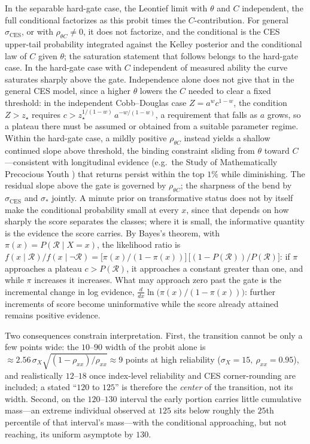 \documentclass{article}
\begin{document}
In the separable hard-gate case, the Leontief limit with $\theta$ and $C$ independent, the full conditional factorizes as this probit times the $C$-contribution. For general $\sigma_{\mathrm{CES}}$, or with $\rho_{\theta C} \neq 0$, it does not factorize, and the conditional is the CES upper-tail probability integrated against the Kelley posterior and the conditional law of $C$ given $\theta$; the saturation statement that follows belongs to the hard-gate case. In the hard-gate case with $C$ independent of measured ability the curve saturates sharply above the gate. Independence alone does not give that in the general CES model, since a higher $\theta$ lowers the $C$ needed to clear a fixed threshold: in the independent Cobb--Douglas case $Z = a^{w} c^{1-w}$, the condition $Z > z_{\star}$ requires $c > z_{\star}^{1/(1-w)}\,a^{-w/(1-w)}$, a requirement that falls as $a$ grows, so a plateau there must be assumed or obtained from a suitable parameter regime. Within the hard-gate case, a mildly positive $\rho_{\theta C}$ instead yields a shallow continued slope above threshold, the binding constraint sliding from $\theta$ toward $C$---consistent with longitudinal evidence (e.g.\ the Study of Mathematically Precocious Youth \cite{lubinski2006}) that returns persist within the top $1\%$ while diminishing. The residual slope above the gate is governed by $\rho_{\theta C}$; the sharpness of the bend by $\sigma_{\mathrm{CES}}$ and $\sigma_{\ast}$ jointly. A minute prior on transformative status does not by itself make the conditional probability small at every $x$, since that depends on how sharply the score separates the classes; where it is small, the informative quantity is the evidence the score carries. By Bayes's theorem, with $\pi(x) = P(\mathcal{R} \mid X = x)$, the likelihood ratio is $f(x\mid \mathcal{R})/f(x\mid\neg \mathcal{R}) = \big[\pi(x)/(1-\pi(x))\big]\,\big[(1-P(\mathcal{R}))/P(\mathcal{R})\big]$: if $\pi$ approaches a plateau $c > P(\mathcal{R})$, it approaches a constant greater than one, and while $\pi$ increases it increases. What may approach zero past the gate is the incremental change in log evidence, $\tfrac{d}{dx}\ln\big(\pi(x)/(1-\pi(x))\big)$: further increments of score become uninformative while the score already attained remains positive evidence.

Two consequences constrain interpretation. First, the transition cannot be only a few points wide: the $10$--$90$ width of the probit alone is $\approx 2.56\,\sigma_X\sqrt{(1-\rho_{xx})/\rho_{xx}}\approx 9$ points at high reliability ($\sigma_X=15,\ \rho_{xx}=0.95$), and realistically $12$--$18$ once index-level reliability and CES corner-rounding are included; a stated ``$120$ to $125$'' is therefore the \emph{center} of the transition, not its width. Second, on the $120$--$130$ interval the early portion carries little cumulative mass---an extreme individual observed at $125$ sits below roughly the $25$th percentile of that interval's mass---with the conditional approaching, but not reaching, its uniform asymptote by $130$.
\end{document}
